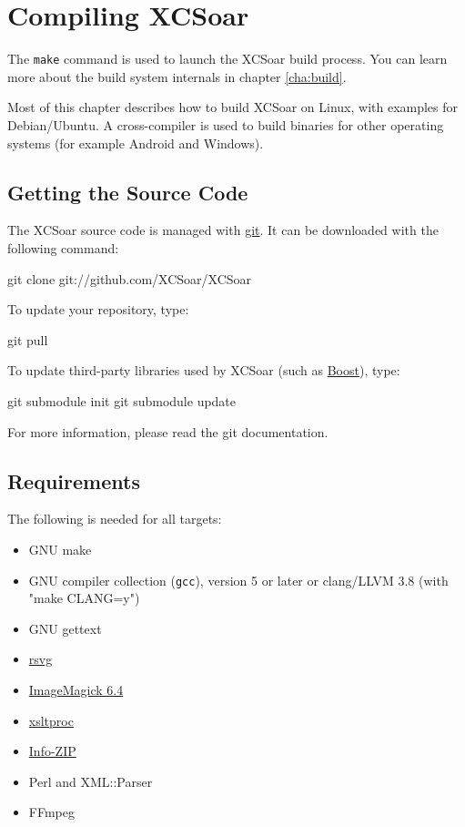 \chapter{Compiling XCSoar}\label{cha:compiling}

The \texttt{make} command is used to launch the XCSoar build process.
You can learn more about the build system internals in chapter
\ref{cha:build}.

Most of this chapter describes how to build XCSoar on Linux, with
examples for Debian/Ubuntu.  A cross-compiler is used to build
binaries for other operating systems (for example Android and
Windows).

\section{Getting the Source Code}

The XCSoar source code is managed with
\href{http://git-scm.com/}{git}.  It can be downloaded with the
following command:

\begin{verbatim*}
git clone git://github.com/XCSoar/XCSoar
\end{verbatim*}

To update your repository, type:

\begin{verbatim*}
git pull
\end{verbatim*}

To update third-party libraries used by XCSoar (such as
\href{http://www.boost.org/}{Boost}), type:

\begin{verbatim*}
git submodule init
git submodule update
\end{verbatim*}

For more information, please read the git documentation.

\section{Requirements}

The following is needed for all targets:

\begin{itemize}
\item GNU make
\item GNU compiler collection (\texttt{gcc}), version 5 or later
  or clang/LLVM 3.8 (with "make CLANG=y")
\item GNU gettext
\item \href{http://librsvg.sourceforge.net/)}{rsvg}
\item \href{http://www.imagemagick.org/}{ImageMagick 6.4}
\item \href{http://xmlsoft.org/XSLT/xsltproc2.html}{xsltproc}
\item \href{http://www.info-zip.org/}{Info-ZIP}
\item Perl and XML::Parser
\item FFmpeg
\end{itemize}

